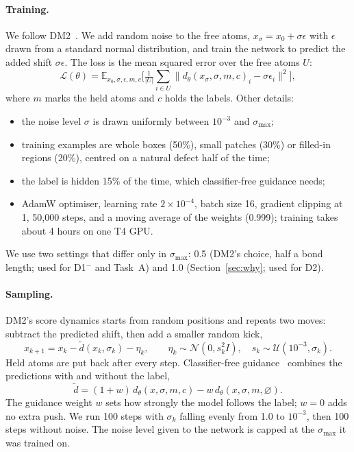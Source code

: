\documentclass[10pt]{article}
\newcommand{\Dm}{D1$^{-}$}
\begin{document}
\paragraph{Training.} We follow DM2~\citep{yang2026dm2}. We add random noise to the free atoms, $x_\sigma = x_0 + \sigma\epsilon$ with $\epsilon$ drawn from a standard normal distribution, and train the network to predict the added shift $\sigma\epsilon$. The loss is the mean squared error over the free atoms $U$:
\begin{equation}
\mathcal{L}(\theta) = \mathbb{E}_{x_0,\sigma,\epsilon,m,c}\Big[\tfrac{1}{|U|}\textstyle\sum_{i\in U}\big\|d_\theta(x_\sigma,\sigma,m,c)_i-\sigma\epsilon_i\big\|^2\Big],
\label{eq:loss}
\end{equation}
where $m$ marks the held atoms and $c$ holds the labels. Other details:
\begin{itemize}
\item the noise level $\sigma$ is drawn uniformly between $10^{-3}$ and $\sigma_\text{max}$;
\item training examples are whole boxes (50\%), small patches (30\%) or filled-in regions (20\%), centred on a natural defect half of the time;
\item the label is hidden 15\% of the time, which classifier-free guidance needs;
\item AdamW optimiser, learning rate $2\times10^{-4}$, batch size 16, gradient clipping at 1, 50{,}000 steps, and a moving average of the weights (0.999); training takes about 4 hours on one T4 GPU.
\end{itemize}
We use two settings that differ only in $\sigma_\text{max}$: 0.5 (DM2's choice, half a bond length; used for \Dm{} and Task~A) and 1.0 (Section~\ref{sec:why}; used for D2).

\paragraph{Sampling.} DM2's score dynamics starts from random positions and repeats two moves: subtract the predicted shift, then add a smaller random kick,
\begin{equation}
x_{k+1} = x_k - \tilde d(x_k,\sigma_k) - \eta_k,\qquad \eta_k\sim\mathcal{N}(0,s_k^2 I),\quad s_k\sim\mathcal{U}(10^{-3},\sigma_k).
\label{eq:sampler}
\end{equation}
Held atoms are put back after every step. Classifier-free guidance~\citep{ho2022cfg} combines the predictions with and without the label,
\begin{equation}
\tilde d = (1+w)\,d_\theta(x,\sigma,m,c) - w\,d_\theta(x,\sigma,m,\varnothing).
\label{eq:cfg}
\end{equation}
The guidance weight $w$ sets how strongly the model follows the label; $w=0$ adds no extra push. We run 100 steps with $\sigma_k$ falling evenly from 1.0 to $10^{-3}$, then 100 steps without noise. The noise level given to the network is capped at the $\sigma_\text{max}$ it was trained on.
\end{document}
